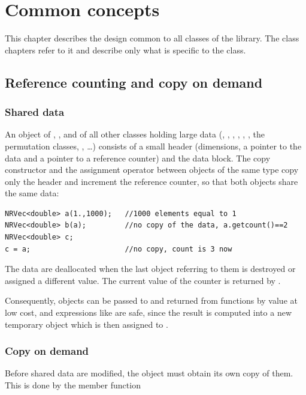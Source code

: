 \chapter{Common concepts}\label{ch:concepts}

This chapter describes the design common to all classes of the library. The class chapters refer to
it and describe only what is specific to the class.

\section{Reference counting and copy on demand}\label{sec:concepts:refcount}

\subsection{Shared data}

An object of , ,  and of all other classes holding large data
(, , , , , , the permutation
classes, , \dots) consists of a small header (dimensions, a pointer to the data and a pointer
to a reference counter) and the data block. The copy constructor and the assignment operator between objects
of the same type copy only the header and increment the reference counter, so that both objects share the
same data:
\begin{lstlisting}
NRVec<double> a(1.,1000);   //1000 elements equal to 1
NRVec<double> b(a);         //no copy of the data, a.getcount()==2
NRVec<double> c;
c = a;                      //no copy, count is 3 now
\end{lstlisting}
The data are deallocated when the last object referring to them is destroyed or assigned a different
value. The current value of the counter is returned by .

Consequently, objects can be passed to and returned from functions by value at low cost, and expressions
like  are safe, since the result is computed into a new temporary object which is then
assigned to .

\subsection{Copy on demand}

Before shared data are modified, the object must obtain its own copy of them. This is done by the member
function
\begin{lareference}
\end{lareference}

